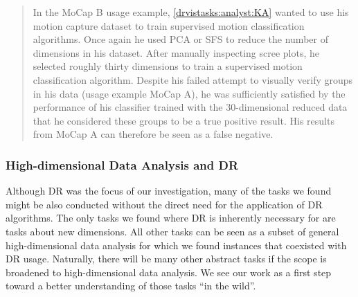 \begin{quotation}
    In the {\sc MoCap B} usage example, \ref{drvistasks:analyst:KA} wanted to use his motion capture dataset to train supervised motion classification algorithms.
    Once again he used \ac{PCA} or \ac{SFS} to reduce the number of dimensions in his dataset. 
    After manually inspecting scree plots, he selected roughly thirty dimensions to train a supervised motion classification algorithm. 
    Despite his failed attempt to visually verify groups in his data (usage example {\sc MoCap A}), he was sufficiently satisfied by the performance of his classifier trained with the 30-dimensional reduced data that he considered these groups to be a true positive result. 
    His results from {\sc MoCap A} can therefore be seen as a false negative.
\end{quotation}


\subsubsection{High-dimensional Data Analysis and DR}
\label{app:drvistasks:dritw:taxonomy:disc}


Although \ac{DR} was the focus of our investigation, many of the tasks we found might be also conducted without the direct need for the application of \ac{DR} algorithms. 
The only tasks we found where \ac{DR} is inherently necessary for are tasks about new dimensions. 
All other tasks can be seen as a subset of general high-dimensional data analysis for which we found instances that coexisted with \ac{DR} usage. 
Naturally, there will be many other abstract tasks if the scope is broadened to high-dimensional data analysis. We see our work as a first step toward a better understanding of those tasks ``in the wild''.

